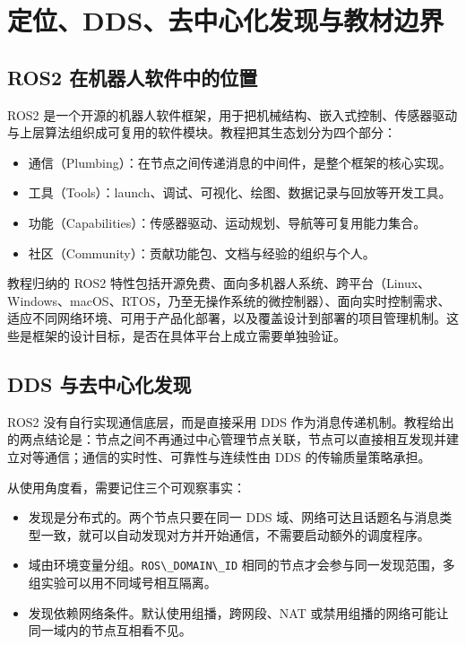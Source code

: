 \section{定位、DDS、去中心化发现与教材边界}\label{ux5b9aux4f4dddsux53bbux4e2dux5fc3ux5316ux53d1ux73b0ux4e0eux6559ux6750ux8fb9ux754c}

\subsection{ROS2
在机器人软件中的位置}\label{ros2-ux5728ux673aux5668ux4ebaux8f6fux4ef6ux4e2dux7684ux4f4dux7f6e}

ROS2
是一个开源的机器人软件框架，用于把机械结构、嵌入式控制、传感器驱动与上层算法组织成可复用的软件模块。教程把其生态划分为四个部分：

\begin{itemize}
\tightlist
\item
  通信（Plumbing）：在节点之间传递消息的中间件，是整个框架的核心实现。
\item
  工具（Tools）：launch、调试、可视化、绘图、数据记录与回放等开发工具。
\item
  功能（Capabilities）：传感器驱动、运动规划、导航等可复用能力集合。
\item
  社区（Community）：贡献功能包、文档与经验的组织与个人。
\end{itemize}

教程归纳的 ROS2
特性包括开源免费、面向多机器人系统、跨平台（Linux、Windows、macOS、RTOS，乃至无操作系统的微控制器）、面向实时控制需求、适应不同网络环境、可用于产品化部署，以及覆盖设计到部署的项目管理机制。这些是框架的设计目标，是否在具体平台上成立需要单独验证。

\subsection{DDS
与去中心化发现}\label{dds-ux4e0eux53bbux4e2dux5fc3ux5316ux53d1ux73b0}

ROS2 没有自行实现通信底层，而是直接采用 DDS
作为消息传递机制。教程给出的两点结论是：节点之间不再通过中心管理节点关联，节点可以直接相互发现并建立对等通信；通信的实时性、可靠性与连续性由
DDS 的传输质量策略承担。

从使用角度看，需要记住三个可观察事实：

\begin{itemize}
\tightlist
\item
  发现是分布式的。两个节点只要在同一 DDS
  域、网络可达且话题名与消息类型一致，就可以自动发现对方并开始通信，不需要启动额外的调度程序。
\item
  域由环境变量分组。\passthrough{\lstinline!ROS\_DOMAIN\_ID!}
  相同的节点才会参与同一发现范围，多组实验可以用不同域号相互隔离。
\item
  发现依赖网络条件。默认使用组播，跨网段、NAT
  或禁用组播的网络可能让同一域内的节点互相看不见。
\end{itemize}

